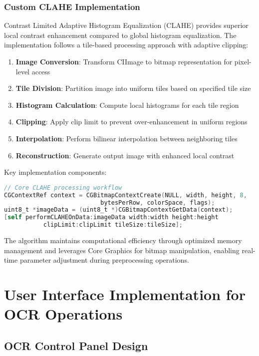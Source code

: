 \subsubsection{Custom CLAHE Implementation}

Contrast Limited Adaptive Histogram Equalization (CLAHE) provides superior local contrast enhancement compared to global histogram equalization. The implementation follows a tile-based processing approach with adaptive clipping:

\begin{enumerate}
\item \textbf{Image Conversion}: Transform CIImage to bitmap representation for pixel-level access
\item \textbf{Tile Division}: Partition image into uniform tiles based on specified tile size
\item \textbf{Histogram Calculation}: Compute local histograms for each tile region
\item \textbf{Clipping}: Apply clip limit to prevent over-enhancement in uniform regions
\item \textbf{Interpolation}: Perform bilinear interpolation between neighboring tiles
\item \textbf{Reconstruction}: Generate output image with enhanced local contrast
\end{enumerate}

Key implementation components:
\begin{lstlisting}[language=C,basicstyle=\footnotesize\ttfamily,frame=single,breaklines=true,columns=flexible]
// Core CLAHE processing workflow
CGContextRef context = CGBitmapContextCreate(NULL, width, height, 8, 
                           bytesPerRow, colorSpace, flags);
uint8_t *imageData = (uint8_t *)CGBitmapContextGetData(context);
[self performCLAHEOnData:imageData width:width height:height 
           clipLimit:clipLimit tileSize:tileSize];
\end{lstlisting}

The algorithm maintains computational efficiency through optimized memory management and leverages Core Graphics for bitmap manipulation, enabling real-time parameter adjustment during preprocessing operations.

\section{User Interface Implementation for OCR Operations}

\subsection{OCR Control Panel Design}

